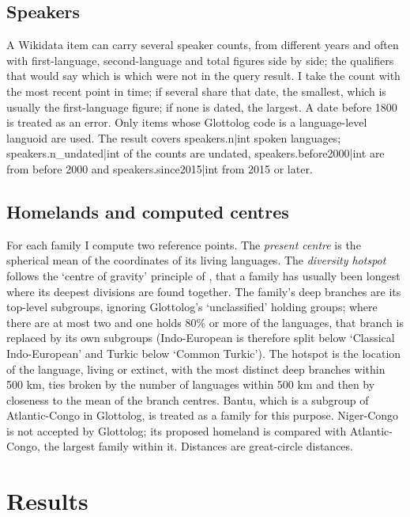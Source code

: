 \documentclass[11pt,a4paper]{article}
\begin{document}
\subsection{Speakers}
A Wikidata item can carry several speaker counts, from different years and often with first-language, second-language and total figures side by side; the qualifiers that would say which is which were not in the query result. I take the count with the most recent point in time; if several share that date, the smallest, which is usually the first-language figure; if none is dated, the largest. A date before 1800 is treated as an error. Only items whose Glottolog code is a language-level languoid are used. The result covers {{speakers.n|int}} spoken languages; {{speakers.n_undated|int}} of the counts are undated, {{speakers.before2000|int}} are from before 2000 and {{speakers.since2015|int}} from 2015 or later.

\subsection{Homelands and computed centres}
For each family I compute two reference points. The \emph{present centre} is the spherical mean of the coordinates of its living languages. The \emph{diversity hotspot} follows the `centre of gravity' principle of \citet{sapir1916}, that a family has usually been longest where its deepest divisions are found together. The family's deep branches are its top-level subgroups, ignoring Glottolog's `unclassified' holding groups; where there are at most two and one holds 80\% or more of the languages, that branch is replaced by its own subgroups (Indo-European is therefore split below `Classical Indo-European' and Turkic below `Common Turkic'). The hotspot is the location of the language, living or extinct, with the most distinct deep branches within 500 km, ties broken by the number of languages within 500 km and then by closeness to the mean of the branch centres. Bantu, which is a subgroup of Atlantic-Congo in Glottolog, is treated as a family for this purpose. Niger-Congo is not accepted by Glottolog; its proposed homeland is compared with Atlantic-Congo, the largest family within it. Distances are great-circle distances.

\section{Results}
\end{document}
